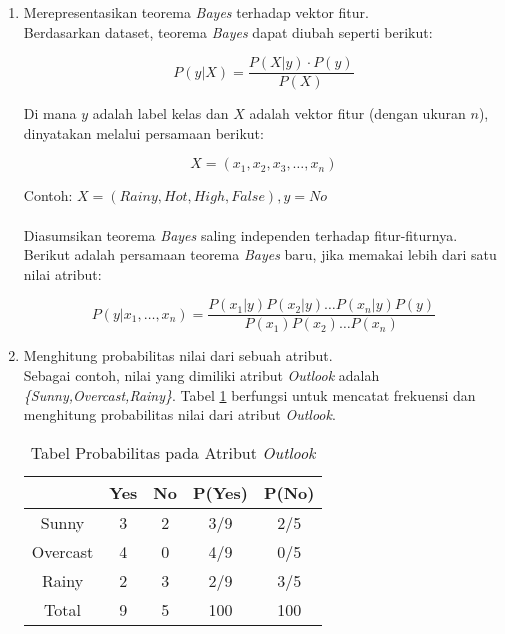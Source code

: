 \begin{enumerate}
\item Merepresentasikan teorema \textit{Bayes} terhadap vektor fitur.\\
Berdasarkan dataset, teorema \textit{Bayes} dapat diubah seperti berikut:

\begin{equation}
P(y|X) = \frac{P(X|y) \cdot P(y)}{P(X)}
\end{equation}

Di mana $y$ adalah label kelas dan $X$ adalah vektor fitur (dengan ukuran $n$), dinyatakan melalui persamaan berikut:

\begin{equation}
X = (x_1, x_2, x_3, \ldots, x_n)
\end{equation}

Contoh: $X = (Rainy, Hot, High, False), y = No$
\\\\
Diasumsikan teorema \textit{Bayes} saling independen terhadap fitur-fiturnya. Berikut adalah persamaan teorema \textit{Bayes} baru, jika memakai lebih dari satu nilai atribut:

\begin{equation}
P(y|x_1,\ldots,x_n) = \frac{P(x_1|y) P(x_2|y) \ldots P(x_n|y) P(y)}{P(x_1) P(x_2) \ldots P(x_n)}
\end{equation}


\item Menghitung probabilitas nilai dari sebuah atribut.\\
Sebagai contoh, nilai yang dimiliki atribut \textit{Outlook} adalah \textit{\{Sunny,Overcast,Rainy\}}. Tabel \ref{table:probabilitas} berfungsi untuk mencatat frekuensi dan menghitung probabilitas nilai dari atribut \textit{Outlook}.


\begin{table}[h]
\centering
\caption{Tabel Probabilitas pada Atribut \textit{Outlook}}
\vspace{0.2cm}
\begin{tabular}{|c|c|c|c|c|}
\hline 
 & Yes & No & P(Yes) & P(No) \\ 
\hline 
Sunny & 3 & 2 & 3/9 & 2/5 \\ 
\hline 
Overcast & 4 & 0 & 4/9 & 0/5 \\ 
\hline 
Rainy & 2 & 3 & 2/9 & 3/5 \\ 
\hline 
Total & 9 & 5 & 100 & 100 \\ 
\hline 
\end{tabular}
\label{table:probabilitas}
\end{table}



\end{enumerate}
